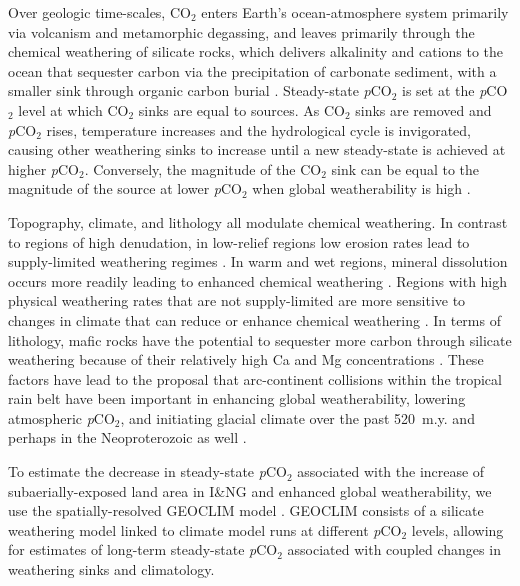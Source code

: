 \documentclass[11pt,letterpaper]{article}
\newcommand{\pCOtwo}{\textit{p}CO$_{2}$\xspace}
\newcommand{\COtwo}{CO$_{2}$\xspace}
\begin{document}
Over geologic time-scales, \COtwo enters Earth's ocean-atmosphere system primarily via volcanism and metamorphic degassing, and leaves primarily through the chemical weathering of silicate rocks, which delivers alkalinity and cations to the ocean that sequester carbon via the precipitation of carbonate sediment, with a smaller sink through organic carbon burial \cite{Kump2000a}. Steady-state \pCOtwo is set at the \pCOtwo level at which \COtwo sinks are equal to sources. As \COtwo sinks are removed and \pCOtwo rises, temperature increases and the hydrological cycle is invigorated, causing other weathering sinks to increase until a new steady-state is achieved at higher \pCOtwo. Conversely, the magnitude of the \COtwo sink can be equal to the magnitude of the source at lower \pCOtwo when global weatherability is high \cite{Kump1997a}.

Topography, climate, and lithology all modulate chemical weathering. In contrast to regions of high denudation, in low-relief regions low erosion rates lead to supply-limited weathering regimes \cite{Gabet2009a, West2012a, Maher2014a}. In warm and wet regions, mineral dissolution occurs more readily leading to enhanced chemical weathering \cite{Lasaga1994a, West2012a}. Regions with high physical weathering rates that are not supply-limited are more sensitive to changes in climate that can reduce or enhance chemical weathering \cite{West2012a, Maher2014a}. In terms of lithology, mafic rocks have the potential to sequester more carbon through silicate weathering because of their relatively high Ca and Mg concentrations \cite{Dessert2003a}. These factors have lead to the proposal that arc-continent collisions within the tropical rain belt have been important in enhancing global weatherability, lowering atmospheric \pCOtwo, and initiating glacial climate over the past 520~m.y. \cite{Jagoutz2016a, Swanson-Hysell2017a, Macdonald2019a} and perhaps in the Neoproterozoic as well \cite{Park2019a}.

To estimate the decrease in steady-state \pCOtwo associated with the increase of subaerially-exposed land area in I\&NG and enhanced global weatherability, we use the spatially-resolved GEOCLIM model \cite{Godderis2014a, Godderis2017c}. GEOCLIM consists of a silicate weathering model linked to climate model runs at different \pCOtwo levels, allowing for estimates of long-term steady-state \pCOtwo associated with coupled changes in weathering sinks and climatology.
\end{document}
